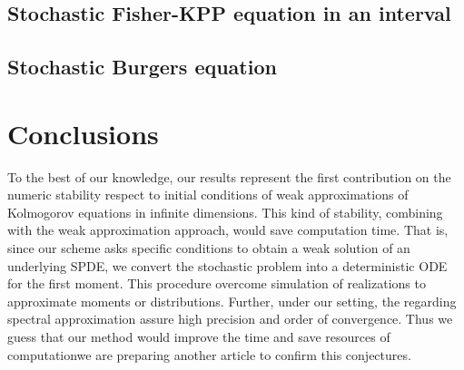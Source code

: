 \documentclass[review,onefignum,onetabnum]{siamart190516}
\begin{document}
    \subsection*{Stochastic Fisher-KPP equation in an interval}
        
    \subsection*{Stochastic Burgers equation}
        

\section{Conclusions}
    To the best of our knowledge, our results represent the first contribution 
    on the numeric stability respect to initial conditions of weak 
    approximations of Kolmogorov equations in infinite dimensions. This kind of 
    stability, combining with the weak approximation approach, would save 
    computation time. That is, since our scheme asks specific conditions to 
    obtain a weak solution of an underlying SPDE, we convert the stochastic 
    problem into a deterministic ODE for the first moment. This procedure 
    overcome simulation of realizations to approximate moments or distributions.
    Further, under our setting, the regarding spectral approximation
    assure high precision and order of convergence. Thus we guess that
    our method would improve the time and save resources of
    computation\textemdash we are preparing another article to confirm this 
    conjectures.



\end{document}

